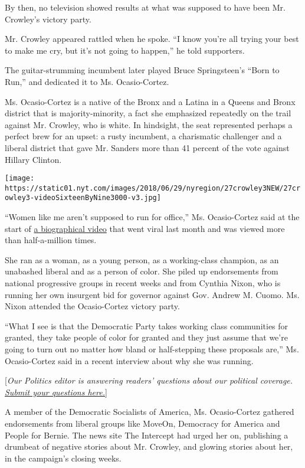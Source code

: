 By then, no television showed results at what was supposed to have been
Mr. Crowley's victory party.

Mr. Crowley appeared rattled when he spoke. ``I know you're all trying
your best to make me cry, but it's not going to happen,'' he told
supporters.

The guitar-strumming incumbent later played Bruce Springsteen's ``Born
to Run,'' and dedicated it to Ms. Ocasio-Cortez.

Ms. Ocasio-Cortez is a native of the Bronx and a Latina in a Queens and
Bronx district that is majority-minority, a fact she emphasized
repeatedly on the trail against Mr. Crowley, who is white. In hindsight,
the seat represented perhaps a perfect brew for an upset: a rusty
incumbent, a charismatic challenger and a liberal district that gave Mr.
Sanders more than 41 percent of the vote against Hillary Clinton.

\texttt{[image: https://static01.nyt.com/images/2018/06/29/nyregion/27crowley3NEW/27crowley3-videoSixteenByNine3000-v3.jpg]}

``Women like me aren't supposed to run for office,'' Ms. Ocasio-Cortez
said at the start of
\href{https://twitter.com/Ocasio2018/status/1001795660524457985}{a
biographical video} that went viral last month and was viewed more than
half-a-million times.

She ran as a woman, as a young person, as a working-class champion, as
an unabashed liberal and as a person of color. She piled up endorsements
from national progressive groups in recent weeks and from Cynthia Nixon,
who is running her own insurgent bid for governor against Gov. Andrew M.
Cuomo. Ms. Nixon attended the Ocasio-Cortez victory party.

``What I see is that the Democratic Party takes working class
communities for granted, they take people of color for granted and they
just assume that we're going to turn out no matter how bland or
half-stepping these proposals are,'' Ms. Ocasio-Cortez said in a recent
interview about why she was running.

{[}\emph{Our Politics editor is answering readers' questions about our
political coverage.}
\href{https://www.nytimes.com/2018/06/26/reader-center/politics-election-coverage.html}{\emph{Submit
your questions here.}}{]}

A member of the Democratic Socialists of America, Ms. Ocasio-Cortez
gathered endorsements from liberal groups like MoveOn, Democracy for
America and People for Bernie. The news site The Intercept had urged her
on, publishing a drumbeat of negative stories about Mr. Crowley, and
glowing stories about her, in the campaign's closing weeks.

